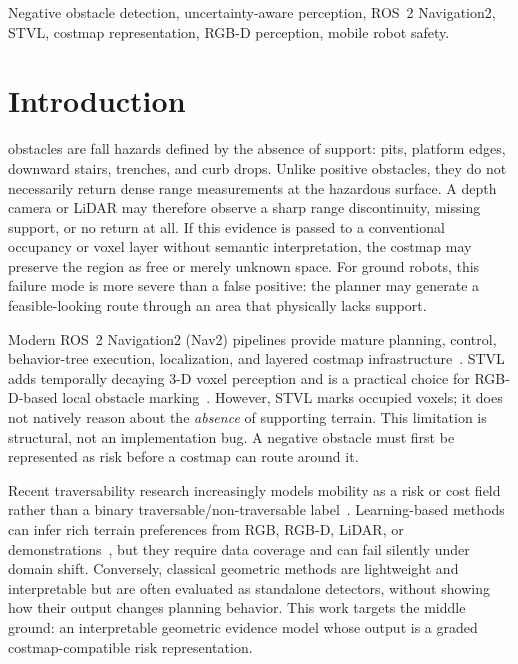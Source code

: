 \documentclass[journal]{IEEEtran}
\begin{document}
\begin{IEEEkeywords}
Negative obstacle detection, uncertainty-aware perception, ROS~2 Navigation2, STVL,
costmap representation, RGB-D perception, mobile robot safety.
\end{IEEEkeywords}

\section{Introduction}
\label{sec:intro}

 obstacles are fall hazards defined by the absence of support:
pits, platform edges, downward stairs, trenches, and curb drops. Unlike positive
obstacles, they do not necessarily return dense range measurements at the hazardous
surface. A depth camera or LiDAR may therefore observe a sharp range discontinuity,
missing support, or no return at all. If this evidence is passed to a conventional
occupancy or voxel layer without semantic interpretation, the costmap may preserve the
region as free or merely unknown space. For ground robots, this failure mode is more
severe than a false positive: the planner may generate a feasible-looking route through
an area that physically lacks support.

Modern ROS~2 Navigation2 (Nav2) pipelines provide mature planning, control, behavior-tree
execution, localization, and layered costmap infrastructure~\cite{macenski2022ros2,
macenski2023nav2}. STVL adds temporally decaying 3-D voxel perception and is a practical
choice for RGB-D-based local obstacle marking~\cite{macenski2020stvl}. However, STVL
marks occupied voxels; it does not natively reason about the \emph{absence} of supporting
terrain. This limitation is structural, not an implementation bug. A negative obstacle
must first be represented as risk before a costmap can route around it.

Recent traversability research increasingly models mobility as a risk or cost field rather
than a binary traversable/non-traversable label~\cite{benrabah2024review,
zhang2024riskcost,step2024}. Learning-based methods can infer rich terrain preferences
from RGB, RGB-D, LiDAR, or demonstrations~\cite{saucedo2024eat,vecchio2024traversability},
but they require data coverage and can fail silently under domain shift. Conversely,
classical geometric methods are lightweight and interpretable but are often evaluated as
standalone detectors, without showing how their output changes planning behavior. This
work targets the middle ground: an interpretable geometric evidence model whose output is
a graded costmap-compatible risk representation.
\end{document}
